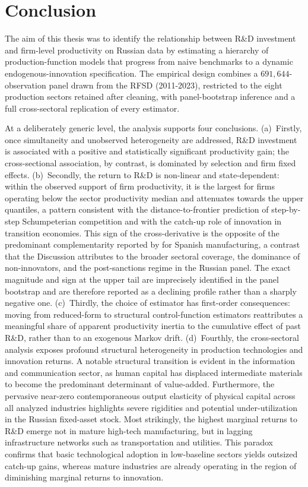 \documentclass[a4paper, 12pt]{article}
\begin{document}
\section{Conclusion}


The aim of this thesis was to identify the relationship between R\&D investment and firm-level productivity on Russian data by estimating a hierarchy of production-function models that progress from naive benchmarks to a dynamic endogenous-innovation specification. The empirical design combines a $691{,}644$-observation panel drawn from the RFSD (2011-2023), restricted to the eight production sectors retained after cleaning, with panel-bootstrap inference and a full cross-sectoral replication of every estimator.


At a deliberately generic level, the analysis supports four conclusions. (a)~Firstly, once simultaneity and unobserved heterogeneity are addressed, R\&D investment is associated with a positive and statistically significant productivity gain; the cross-sectional association, by contrast, is dominated by selection and firm fixed effects. (b)~Secondly, the return to R\&D is non-linear and state-dependent: within the observed support of firm productivity, it is the largest for firms operating below the sector productivity median and attenuates towards the upper quantiles, a pattern consistent with the distance-to-frontier prediction of step-by-step Schumpeterian competition and with the catch-up role of innovation in transition economies. This sign of the cross-derivative is the opposite of the predominant complementarity reported by \textcite{doraszelski2013r} for Spanish manufacturing, a contrast that the Discussion attributes to the broader sectoral coverage, the dominance of non-innovators, and the post-sanctions regime in the Russian panel. The exact magnitude and sign at the upper tail are imprecisely identified in the panel bootstrap and are therefore reported as a declining profile rather than a sharply negative one. (c)~Thirdly, the choice of estimator has first-order consequences: moving from reduced-form to structural control-function estimators reattributes a meaningful share of apparent productivity inertia to the cumulative effect of past R\&D, rather than to an exogenous Markov drift. (d)~Fourthly, the cross-sectoral analysis exposes profound structural heterogeneity in production technologies and innovation returns. A notable structural transition is evident in the information and communication sector, as human capital has displaced intermediate materials to become the predominant determinant of value-added. Furthermore, the pervasive near-zero contemporaneous output elasticity of physical capital across all analyzed industries highlights severe rigidities and potential under-utilization in the Russian fixed-asset stock. Most strikingly, the highest marginal returns to R\&D emerge not in mature high-tech manufacturing, but in lagging infrastructure networks such as transportation and utilities. This paradox confirms that basic technological adoption in low-baseline sectors yields outsized catch-up gains, whereas mature industries are already operating in the region of diminishing marginal returns to innovation.
\end{document}
